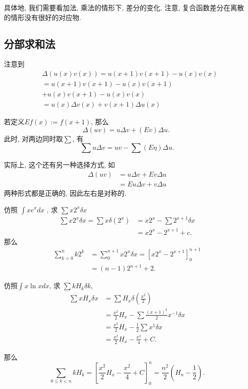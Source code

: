 \documentclass{ctexart}
\begin{document}
具体地, 我们需要看加法, 乘法的情形下, 差分的变化. 注意, 复合函数差分在离散的情形没有很好的对应物.

\subsection{分部求和法}
注意到
$$
	\begin{aligned}
		 & \Delta(u(x) v(x))= u(x+1) v(x+1)-u(x) v(x) \\
		 & = u(x+1) v(x+1)-u(x) v(x+1)                \\
		 & +u(x) v(x+1)-u(x) v(x)                     \\
		 & =u(x) \Delta v(x)+v(x+1) \Delta u(x)
	\end{aligned}
$$

若定义$E f(x):=f(x+1)$, 那么
$$
	\Delta(u v)=u \Delta v+(E v) \Delta u \text {. }
$$
此时, 对两边同时取$\sum$, 有
$$
	\sum u \Delta v=u v-\sum(E \eta) \Delta u .
$$
\begin{remark}
	实际上, 这个还有另一种选择方式, 如
	$$
		\begin{aligned}
			\Delta(u v) & =u \Delta v+E v \Delta u \\
			            & =E u \Delta v+v \Delta u
		\end{aligned}
	$$
	两种形式都是正确的, 因此左右是对称的.
\end{remark}

\begin{example}仿照 $\int x e^x d x$ ,  求 $\sum x 2^x \delta x$
	$$
		\begin{aligned} \sum x\boxed{2^x} \delta x=\sum x \delta\left(2^x\right) & =x 2^x-\sum 2^{\boxed{x+1}} \delta x \\ & =x 2^x-2^{x+1}+c .\end{aligned}
	$$
	那么
	$$
		\begin{aligned}
			\sum_{k=0}^n k 2^k & =\sum_0^{n+1} x 2^x \delta x=\left[x 2^x-2^{x+1}\right]_0^{n+1} \\
			                   & =(n-1) 2^{n+1}+2 .
		\end{aligned}
	$$
\end{example}

\begin{example}仿照$\int x \ln x d x$, 求 $\sum k H_k \delta k$,
	$$
		\begin{aligned}
			\sum \boxed{x} H_x \delta x & = \sum H_x \delta\left(\frac{x^{\underline{2}}}{2}\right)                                \\
			                            & = \frac{x^2}{2} H_x - \sum \frac{(x+1)^{\underline{2}}}{{2}} x^{\underline{-1}} \delta x \\
			                            & = \frac{x^2}{2} H_x - \frac{1}{2} \sum x^{\underline{1}} \delta x                        \\
			                            & = \frac{x^2}{2} H_x - \frac{x^2}{4} + C.
		\end{aligned}
	$$

	那么
	$$
		\sum_{0 \leqslant k<n} k H_k=\left[\frac{x^2}{2} H_x-\frac{x^2}{4}+C\right]_0^n=\frac{n^{\underline{2}}}{2}\left(H_n-\frac{1}{2}\right) .
	$$

\end{example}
\end{document}
